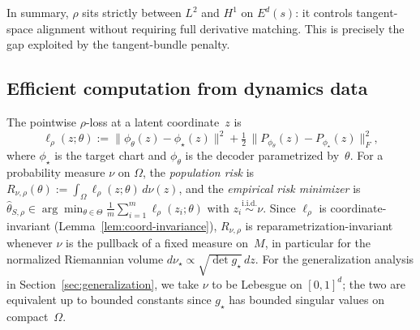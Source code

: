 \documentclass[11pt]{article}
\newcommand{\Om}{\Omega}
\newcommand{\norm}[1]{\lVert#1\rVert}
\begin{document}
In summary, $\rho$ sits strictly between $L^2$ and $H^1$ on
$E^d(s)$: it controls tangent-space alignment without requiring
full derivative matching.
This is precisely the gap exploited by the tangent-bundle penalty.

\subsection{Efficient computation from dynamics
  data}\label{ssec:efficient-computation}

The pointwise $\rho$-loss at a latent coordinate~$z$ is
$$\ell_\rho(z;\theta)
:= \norm{\phi_\theta(z) - \phi_\star(z)}^2
 + \tfrac{1}{2}\,\norm{P_{\phi_\theta}(z) - P_{\phi_\star}(z)}_F^2,$$
where $\phi_\star$ is the target chart and $\phi_\theta$ is the
decoder parametrized by~$\theta$.
For a probability measure $\nu$ on $\Om$, the
\emph{population risk} is
$R_{\nu,\rho}(\theta) := \int_\Om \ell_\rho(z;\theta)\,d\nu(z)$,
and the \emph{empirical risk minimizer} is
$\hat\theta_{S,\rho}
\in \arg\min_{\theta\in\Theta}
\tfrac{1}{m}\sum_{i=1}^{m}\ell_\rho(z_i;\theta)$
with $z_i\stackrel{\text{i.i.d.}}{\sim}\nu$.
Since $\ell_\rho$ is coordinate-invariant
(Lemma~\ref{lem:coord-invariance}), $R_{\nu,\rho}$ is
reparametrization-invariant whenever $\nu$ is the pullback of a
fixed measure on~$M$, in particular for the normalized Riemannian
volume $d\nu_\star \propto \sqrt{\det g_\star}\,dz$.
For the generalization analysis in
Section~\ref{sec:generalization}, we take $\nu$ to be
Lebesgue on $[0,1]^d$; the two are equivalent up to bounded
constants since $g_\star$ has bounded singular values on
compact~$\Om$.
\end{document}
